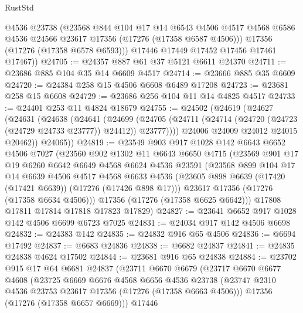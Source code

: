 \begin{lexlean}{RustStd}
\begin{coremodule}
          @4536
          @23738
          (@23568
            @844
            @104
            @17
            @14
            @6543
            @4506
            @4517
            @4568
            @6586
            @4536
            @24566
            @23617
            @17356
            (@17276 (@17358 @6587 @4506)))
          @17356
          (@17276 (@17358 @6578 @6593)))
        @17446
        @17449
        @17452
        @17456
        @17461
        @17467))
@24705 := @24357 @887 @61 @37 @5121 @6611 @24370
@24711 := @23686 @885 @104 @35 @14 @6609 @4517
@24714 := @23666 @885 @35 @6609
@24720 := @24384 @258 @15 @4506 @6608 @6489 @17208
@24723 := @23681 @258 @15 @6608
@24729 := @23686 @256 @104 @11 @14 @4825 @4517
@24733 := @24401 @253 @11 @4824 @18679
@24755 := @24502
    (@24619
      (@24627
        (@24631
          (@24638
            (@24641
              (@24699
                (@24705 (@24711 (@24714 (@24720 (@24723 (@24729 @24733 @23777)) @24412)) @23777))))
            @24006
            @24009
            @24012
            @24015
            @20462))
        @24065))
@24819 := @23549
    @903
    @917
    @1028
    @142
    @6643
    @6652
    @4506
    @7027
    (@23560
      @902
      @1302
      @11
      @6643
      @6650
      @4715
      (@23569
        @901
        @17
        @19
        @6260
        @6642
        @6649
        @4568
        @6624
        @4536
        @23591
        (@23568
          @899
          @104
          @17
          @14
          @6639
          @4506
          @4517
          @4568
          @6633
          @4536
          (@23605 @898 @6639 (@17420 (@17421 @6639)) (@17276 (@17426 @898 @17)))
          @23617
          @17356
          (@17276 (@17358 @6634 @4506)))
        @17356
        (@17276 (@17358 @6625 @6642)))
      @17808
      @17811
      @17814
      @17818
      @17823
      @17829)
@24827 := @23641 @6652 @917 @1028 @142 @4506 @6699 @6723 @7025
@24831 := @24034 @917 @142 @4506 @6698
@24832 := @24383 @142
@24835 := @24832 @916 @65 @4506
@24836 := @6694 @17492
@24837 := @6683 @24836
@24838 := @6682 @24837
@24841 := @24835 @24838 @4624 @17502
@24844 := @23681 @916 @65 @24838
@24884 := @23702
    @915
    @17
    @64
    @6681
    @24837
    (@23711
      @6670
      @6679
      (@23717
        @6670
        @6677
        @4608
        (@23725
          @6669
          @6676
          @4568
          @6656
          @4536
          @23738
          (@23747 @2310 @4536 @23753 @23617 @17356 (@17276 (@17358 @6663 @4506)))
          @17356
          (@17276 (@17358 @6657 @6669)))
        @17446

\end{coremodule}
\end{lexlean}
